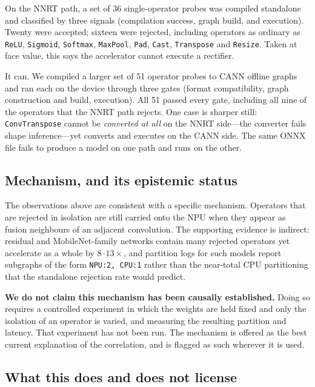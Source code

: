 \documentclass[conference]{IEEEtran}
\begin{document}
On the NNRT path, a set of 36 single-operator probes was compiled standalone and
classified by three signals (compilation success, graph build, and execution).
Twenty were accepted; sixteen were rejected, including operators as ordinary as
\texttt{ReLU}, \texttt{Sigmoid}, \texttt{Softmax}, \texttt{MaxPool},
\texttt{Pad}, \texttt{Cast}, \texttt{Transpose} and \texttt{Resize}. Taken at
face value, this says the accelerator cannot execute a rectifier.

It can. We compiled a larger set of 51 operator probes to CANN offline graphs
and ran each on the device through three gates (format compatibility, graph
construction and build, execution). All 51 passed every gate, including all nine
of the operators that the NNRT path rejects. One case is sharper still:
\texttt{ConvTranspose} cannot be \emph{converted at all} on the NNRT side---the
converter fails shape inference---yet converts and executes on the CANN side.
The same ONNX file fails to produce a model on one path and runs on the other.

\subsection{Mechanism, and its epistemic status}

The observations above are consistent with a specific mechanism. Operators that
are rejected in isolation are still carried onto the NPU when they appear as
fusion neighbours of an adjacent convolution. The supporting evidence is
indirect: residual and MobileNet-family networks contain many rejected operators
yet accelerate as a whole by $8$--$13\times$, and partition logs for such models
report subgraphs of the form \texttt{NPU:2, CPU:1} rather than the near-total
CPU partitioning that the standalone rejection rate would predict.

\textbf{We do not claim this mechanism has been causally established.} Doing so
requires a controlled experiment in which the weights are held fixed and only
the isolation of an operator is varied, and measuring the resulting partition
and latency. That experiment has not been run. The mechanism is offered as the
best current explanation of the correlation, and is flagged as such wherever it
is used.

\subsection{What this does and does not license}
\end{document}
